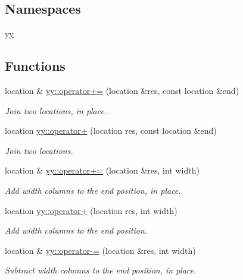 \subsection*{Namespaces}
\begin{DoxyCompactItemize}
\item 
\hyperlink{namespaceyy}{yy}
\end{DoxyCompactItemize}
\subsection*{Functions}
\begin{DoxyCompactItemize}
\item 
location \& \hyperlink{namespaceyy_ac14111e26538c547c68b89899951b6b7}{yy\-::operator+=} (location \&res, const location \&end)
\begin{DoxyCompactList}\small\item\em Join two locations, in place. \end{DoxyCompactList}\item 
location \hyperlink{namespaceyy_ad82fe89bde177a8060bad10aca431c79}{yy\-::operator+} (location res, const location \&end)
\begin{DoxyCompactList}\small\item\em Join two locations. \end{DoxyCompactList}\item 
location \& \hyperlink{namespaceyy_ab13826f998b111c25c9bf8132c4d63b8}{yy\-::operator+=} (location \&res, int width)
\begin{DoxyCompactList}\small\item\em Add {\itshape width} columns to the end position, in place. \end{DoxyCompactList}\item 
location \hyperlink{namespaceyy_a79201bfa5eaeb04bf279a05ff13281df}{yy\-::operator+} (location res, int width)
\begin{DoxyCompactList}\small\item\em Add {\itshape width} columns to the end position. \end{DoxyCompactList}\item 
location \& \hyperlink{namespaceyy_adf13d2c8b51d1b5c23eb84fce25d202c}{yy\-::operator-\/=} (location \&res, int width)
\begin{DoxyCompactList}\small\item\em Subtract {\itshape width} columns to the end position, in place. \end{DoxyCompactList}\item 

\end{DoxyCompactItemize}
